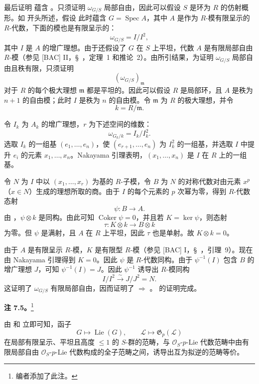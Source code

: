 最后证明  蕴含 。只须证明 \(\omega_{G/S}\) 局部自由，因此可以假设 \(S\) 是环为 \(R\) 的仿射概形。如  开头所述，假设  此时蕴含 \(G=\operatorname{Spec}A\)，其中 \(A\) 是作为 \(R\)-模有限呈示的 \(R\)-代数，下面的模也是有限呈示的：
\[
  \omega_{G/S}=I/I^2,
\]
其中 \(I\) 是 \(A\) 的增广理想。由于还假设了 \(G\) 在 \(S\) 上平坦，代数 \(A\) 是有限局部自由 \(R\)-模（参见 [BAC] II，\S~，定理~1 和推论~2）。由所引结果，为证明 \(\omega_{G/S}\) 局部自由且秩有限，只须证明
\[
  (\omega_{G/S})_{\mathfrak m}
\]
对于 \(R\) 的每个极大理想 \(\mathfrak m\) 都是平坦的。因此可以假设 \(R\) 是局部环，且 \(A\) 是秩为 \(n+1\) 的自由模；此时 \(I\) 是秩为 \(n\) 的自由模。令 \(\mathfrak m\) 为 \(R\) 的极大理想，并令
\[
  k=R/\mathfrak m.
\]

令 \(I_k\) 为 \(A_k\) 的增广理想，\(r\) 为下述空间的维数：
\[
  \omega_{G_k/k}=I_k/I_k^2.
\]
选取 \(I_k\) 的一组基 \((e_1,\ldots,e_n)\)，使 \((e_{r+1},\ldots,e_n)\) 为 \(I_k^2\) 的一组基，并选取 \(I\) 中提升 \(e_i\) 的元素 \(x_1,\ldots,x_n\)。Nakayama 引理表明，\((x_1,\ldots,x_n)\) 是 \(I\) 在 \(R\) 上的一组基。

令 \(N\) 为 \(I\) 中以 \((x_1,\ldots,x_r)\) 为基的 \(R\)-子模，令 \(B\) 为 \(N\) 的对称代数对由元素 \(x^p\)（\(x\in N\)）生成的理想所取的商。由于 \(I\) 的每个元素的 \(p\) 次幂为零，得到 \(R\)-代数态射
\[
  \psi:B\longrightarrow A.
\]
由 ，\(\psi\otimes k\) 是同构。由此可知 \(\operatorname{Coker}\psi=0\)，并且若 \(K=\ker\psi\)，则态射
\[
  \tau:K\otimes k\longrightarrow B\otimes k
\]
为零。但 \(\psi\) 是满射，且 \(A\) 在 \(R\) 上平坦，因此 \(\tau\) 也是单射。故 \(K\otimes k=0\)。

由于 \(A\) 是有限呈示 \(R\)-模，\(K\) 是有限型 \(R\)-模（参见 [BAC] I，\S~，引理~9）。现在由 Nakayama 引理得到 \(K=0\)。因此 \(\psi\) 是 \(R\)-代数同构。由于 \(\psi^{-1}(I)\) 包含 \(B\) 的增广理想 \(J\)，可知 \(\psi^{-1}(I)=J\)。因此 \(\psi^{-1}\) 诱导出 \(R\)-模同构
\[
  I/I^2
  \xrightarrow{\sim}
  J/J^2=N.
\]
这证明了 \(\omega_{G/S}\) 有限局部自由，因而证明了  \(\Rightarrow\) 。 的证明完成。

\medskip
\noindent\textbf{注 7.5。}\footnote{编者添加了此注。}
\label{sga3:VIIA:7.5}

由  和  立即可知，函子
\[
  G\longmapsto\operatorname{Lie}(G),
  \qquad
  \mathcal L\longmapsto\mathfrak G_p(\mathcal L)
\]
在局部有限呈示、平坦且高度 \(\leq1\) 的 \(S\)-群的范畴，与 \(\mathcal O_S\)-\(p\)-Lie 代数范畴中由有限局部自由 \(\mathcal O_S\)-\(p\)-Lie 代数构成的全子范畴之间，诱导出互为拟逆的范畴等价。

